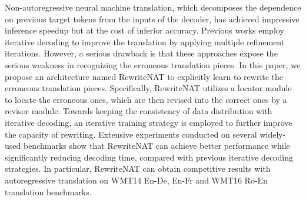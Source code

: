 Non-autoregressive neural machine translation, which decomposes the dependence on previous target tokens from the inputs of the decoder, has achieved impressive inference speedup but at the cost of inferior accuracy. Previous works employ iterative decoding to improve the translation by applying multiple refinement iterations. However, a serious drawback is that these approaches expose the serious weakness in recognizing the erroneous translation pieces. In this paper, we propose an architecture named RewriteNAT to explicitly learn to rewrite the erroneous translation pieces. Specifically, RewriteNAT utilizes a locator module to locate the erroneous ones, which are then revised into the correct ones by a revisor module. Towards keeping the consistency of data distribution with iterative decoding, an iterative training strategy is employed to further improve the capacity of rewriting. Extensive experiments conducted on several widely-used benchmarks show that RewriteNAT can achieve better performance while significantly reducing decoding time, compared with previous iterative decoding strategies. In particular, RewriteNAT can obtain competitive results with autoregressive translation on WMT14 En-De, En-Fr and WMT16 Ro-En translation benchmarks.
